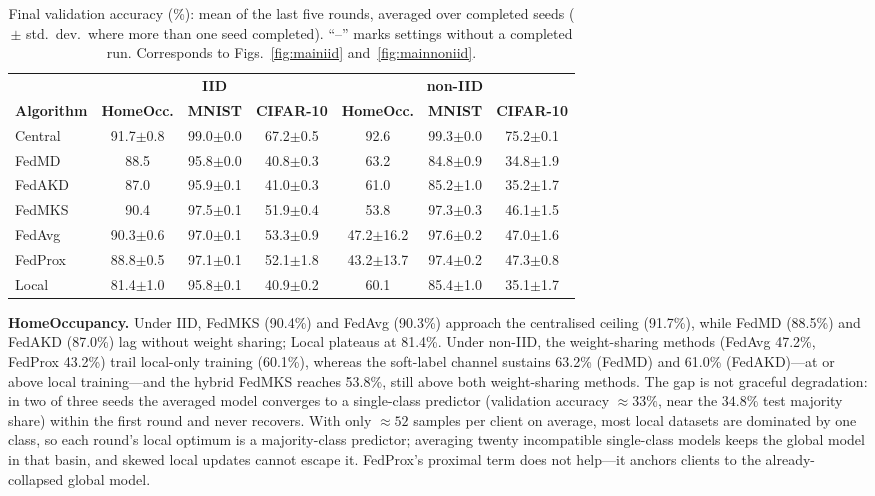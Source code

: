 \documentclass[conference]{IEEEtran}
\begin{document}
\begin{table}[t]
\centering\small
\caption{Final validation accuracy (\%): mean of the last five rounds,
  averaged over completed seeds ($\pm$ std.\ dev.\ where more than one
  seed completed).  ``--'' marks settings without a completed run.
  Corresponds to Figs.~\ref{fig:mainiid} and~\ref{fig:mainnoniid}.}
\label{tab:mainscores}
\setlength{\tabcolsep}{5pt}
\begin{tabular}{@{}lcccccc@{}}
\toprule
& \multicolumn{3}{c}{\textbf{IID}} & \multicolumn{3}{c}{\textbf{non-IID}}\\
\cmidrule(lr){2-4}\cmidrule(lr){5-7}
\textbf{Algorithm} & \textbf{HomeOcc.} & \textbf{MNIST} & \textbf{CIFAR-10}
  & \textbf{HomeOcc.} & \textbf{MNIST} & \textbf{CIFAR-10}\\
\midrule
Central & 91.7$\pm$0.8 & 99.0$\pm$0.0 & 67.2$\pm$0.5 & 92.6 & 99.3$\pm$0.0 & 75.2$\pm$0.1 \\
FedMD & 88.5 & 95.8$\pm$0.0 & 40.8$\pm$0.3 & 63.2 & 84.8$\pm$0.9 & 34.8$\pm$1.9 \\
FedAKD & 87.0 & 95.9$\pm$0.1 & 41.0$\pm$0.3 & 61.0 & 85.2$\pm$1.0 & 35.2$\pm$1.7 \\
FedMKS & 90.4 & 97.5$\pm$0.1 & 51.9$\pm$0.4 & 53.8 & 97.3$\pm$0.3 & 46.1$\pm$1.5 \\
FedAvg & 90.3$\pm$0.6 & 97.0$\pm$0.1 & 53.3$\pm$0.9 & 47.2$\pm$16.2 & 97.6$\pm$0.2 & 47.0$\pm$1.6 \\
FedProx & 88.8$\pm$0.5 & 97.1$\pm$0.1 & 52.1$\pm$1.8 & 43.2$\pm$13.7 & 97.4$\pm$0.2 & 47.3$\pm$0.8 \\
Local & 81.4$\pm$1.0 & 95.8$\pm$0.1 & 40.9$\pm$0.2 & 60.1 & 85.4$\pm$1.0 & 35.1$\pm$1.7 \\
\bottomrule
\end{tabular}
\end{table}

\textbf{HomeOccupancy.}
Under IID, FedMKS (90.4\%) and FedAvg (90.3\%) approach the centralised
ceiling (91.7\%), while FedMD (88.5\%) and FedAKD (87.0\%) lag without
weight sharing; Local plateaus at 81.4\%.  Under non-IID, the
weight-sharing methods (FedAvg 47.2\%, FedProx 43.2\%) trail
local-only training (60.1\%), whereas the soft-label channel
sustains 63.2\% (FedMD) and 61.0\% (FedAKD)---at or above local
training---and the hybrid FedMKS reaches 53.8\%, still above both
weight-sharing methods.  The gap is not graceful degradation:
in two of three seeds the averaged model converges to a single-class
predictor (validation accuracy ${\approx}33\%$, near the $34.8\%$ test
majority share) within the first round and never recovers.  With only
${\approx}52$ samples per client on average, most local datasets are
dominated by
one class, so each round's local optimum is a majority-class predictor;
averaging twenty incompatible single-class models keeps the global
model in that basin, and skewed local updates cannot escape it.
FedProx's proximal term does not help---it anchors clients to the
already-collapsed global model.
\end{document}
